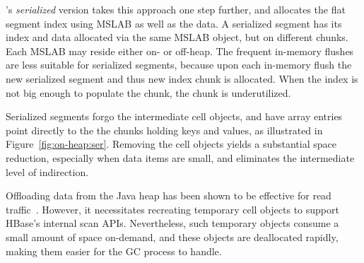 \sys's \emph{serialized} version takes this approach one step further, and allocates the flat segment index
using MSLAB as well as the data. 
A serialized segment has its index and data allocated via the same MSLAB object, but on different chunks. 
Each MSLAB may reside either on- or off-heap. The frequent in-memory flushes are less suitable for serialized segments, because upon each in-memory flush the new serialized segment and thus new index chunk is allocated. When the index is not big enough to populate the chunk, the chunk is underutilized.

Serialized segments forgo the intermediate cell
objects, and have array entries point directly to the the chunks holding keys and values, as illustrated in 
Figure~\ref{fig:on-heap:ser}.  
Removing the cell objects yields
a substantial space reduction, especially when data items are small, and eliminates the intermediate level of indirection.
 
Offloading  data from the Java heap 
has been shown to be effective for read traffic~\cite{alibabahbase}. However, it necessitates recreating temporary
cell objects to support HBase's internal scan APIs. Nevertheless, such temporary objects consume  a small amount of space on-demand, 
and these objects are  deallocated rapidly, making them easier for the GC process to handle.

\newpage




